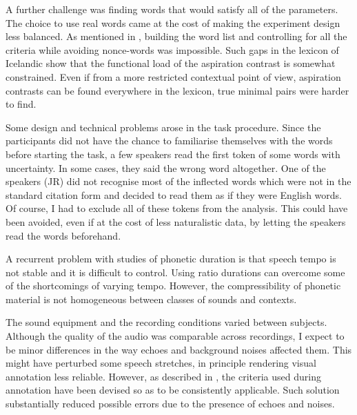 \documentclass[11pt,a4paper,openany]{memoir}\usepackage[]{graphicx}\usepackage[]{color}
\begin{document}
A further challenge was finding words that would satisfy all of the parameters.
The choice to use real words came at the cost of making the experiment design less balanced.
As mentioned in , building the word list and controlling for all the criteria while avoiding nonce-words was impossible.
Such gaps in the lexicon of Icelandic show that the functional load of the aspiration contrast is somewhat constrained.
Even if from a more restricted contextual point of view, aspiration contrasts can be found everywhere in the lexicon, true minimal pairs were harder to find.

Some design and technical problems arose in the task procedure.
Since the participants did not have the chance to familiarise themselves with the words before starting the task, a few speakers read the first token of some words with uncertainty.
In some cases, they said the wrong word altogether.
One of the speakers (JR) did not recognise most of the inflected words which were not in the standard citation form and decided to read them as if they were English words.
Of course, I had to exclude all of these tokens from the analysis.
This could have been avoided, even if at the cost of less naturalistic data, by letting the speakers read the words beforehand.

A recurrent problem with studies of phonetic duration is that speech tempo is not stable and it is difficult to control.
Using ratio durations can overcome some of the shortcomings of varying tempo.
However, the compressibility of phonetic material is not homogeneous between classes of sounds and contexts.

The sound equipment and the recording conditions varied between subjects.
Although the quality of the audio was comparable across recordings, I expect to be minor differences in the way echoes and background noises affected them.
This might have perturbed some speech stretches, in principle rendering visual annotation less reliable.
However, as described in , the criteria used during annotation have been devised so as to be consistently applicable.
Such solution substantially reduced possible errors due to the presence of echoes and noises.
\end{document}
